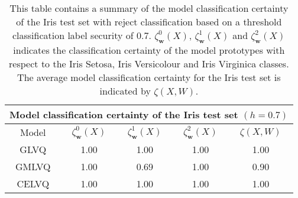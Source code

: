 \documentclass[english]{HSMW-Thesis}
\begin{document}
	\begin{table}[H]
	\centering
	\begin{tabular}{ |c|c|c|c|c|  }
		\hline
		\multicolumn{5}{|c|}{Model classification certainty of the Iris test set $(h=0.7)$} \\
		\hline
		Model &$\zeta_{\mathbf{w}}^{0}(X) $   & $\zeta_{\mathbf{w}}^{1}(X)$ &$\zeta_{\mathbf{w}}^{2}(X)$  &$\zeta(X,W)$   \\
		\hline
		GLVQ &1.00   &1.00  &1.00  &1.00  \\
		GMLVQ &1.00  &0.69  &1.00  &0.90   \\
		CELVQ &1.00  &1.00  &1.00 &1.00  \\		
		\hline
	\end{tabular}
	\caption[Summary of model classification certainty of the Iris test set with threshold security]{\label{tab:Iris summary1}This table contains a summary of the model classification certainty of the Iris test set with reject classification based on a threshold classification label security of 0.7.\hspace{2pt} $\zeta_{\mathbf{w}}^{0}(X) $,\hspace{2pt} $\zeta_{\mathbf{w}}^{1}(X)$\hspace{2pt} and\hspace{2pt} $\zeta_{\mathbf{w}}^{2}(X)$\hspace{2pt} indicates the classification certainty of the model prototypes with respect to the Iris Setosa, Iris Versicolour and Iris Virginica classes. The average model classification certainty for the Iris test set is indicated by\hspace{2pt} $\zeta(X,W)$.}
\end{table}
\end{document}

